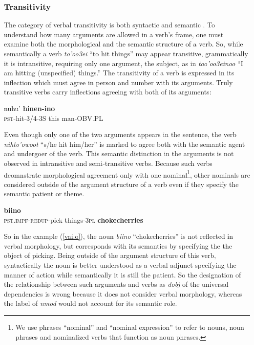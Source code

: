 \documentclass[11pt]{article}
\begin{document}
\subsubsection{Transitivity}
The category of verbal transitivity is both syntactic and semantic \cite{Cow08}. To understand how many arguments are allowed in a verb's frame, one must examine both the morphological and the semantic structure of a verb. So, while semantically a verb \textit{to'oo3ei } ``to hit things'' may appear transitive, grammatically it is intransitive, requiring only one argument, the subject, as in \textit{too'oo3einoo} ``I am hitting (unspecified) things.'' The transitivity of a verb is expressed in its inflection which must agree in person and number with its arguments. Truly transitive verbs carry inflections agreeing with both of its arguments:
\begin{exe}
\ex \label{trans} 
\small
{} nuhu' \textbf{hinen-ino}\\
{\textsc{pst}-hit-\textsc{3/4-3S}} this man-OBV.PL\\
\end{exe}
\normalsize
Even though only one of the two arguments appears in the sentence, the verb \textit{nihto'owoot} ``s/he hit him/her'' is marked to agree both with the semantic agent and undergoer of the verb. This semantic distinction in the arguments is not observed in intransitive and semi-transitive verbs. Because such verbs deomnstrate morphological agreement only with one nominal\footnote{We use  phrases ``nominal'' and ``nominal expression'' to refer to nouns, noun phrases and nominalized verbs that function as noun phrases.}, other nominals are considered outside of the argument structure of a verb even if they specify the semantic patient or theme. 

\small
\begin{exe}
\ex \label{vai.o} 
 \textbf{biino}\\
{\textsc{pst.impf}-\textsc{redup}-pick things-3\textsc{pl}}  \textbf{chokecherries}\\
\end{exe}
\normalsize
So in the example (\ref{vai.o}), the noun \textit{biino} ``chokecherries'' is not reflected in verbal morphology, but corresponds with its semantics by specifying the the object of picking. Being outside of the argument structure of this verb, syntactically the noun is better understood as a verbal adjunct specifying the manner of action while semantically it is still the patient. So the designation of the relationship between such arguments and verbs as \textit{dobj} of the universal dependencies is wrong because it does not consider verbal morphology, whereas the label of \textit{nmod} would not account for its semantic role.
\end{document}

